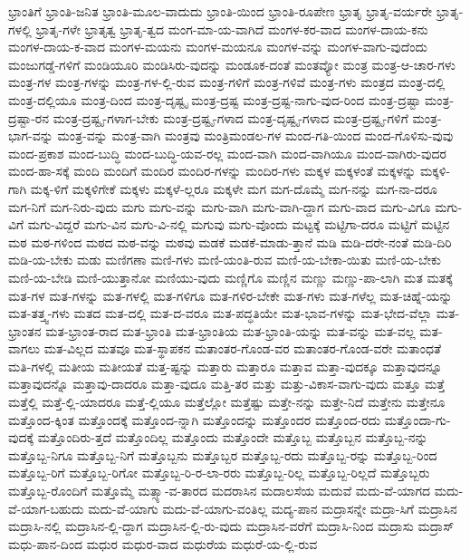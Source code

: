 {ಭ್ರಾಂತಿಗೆ
ಭ್ರಾಂತಿ-ಜನಿತ
ಭ್ರಾಂತಿ-ಮೂಲ-ವಾದುದು
ಭ್ರಾಂತಿ-ಯಿಂದ
ಭ್ರಾಂತಿ-ರೂಪೇಣ
ಭ್ರಾತೃ
ಭ್ರಾತೃ-ವರ್ಯರೇ
ಭ್ರಾತೃ-ಗಳಲ್ಲಿ
ಭ್ರಾತೃ-ಗಳೇ
ಭ್ರಾತೃತ್ವ
ಭ್ರಾತೃ-ತ್ವದ
ಮಂಗ-ಮಾ-ಯ-ವಾಗಿದೆ
ಮಂಗಳ-ಕರ-ವಾದ
ಮಂಗಳ-ದಾಯ-ಕನು
ಮಂಗಳ-ದಾಯ-ಕ-ವಾದ
ಮಂಗಳ-ಮಯನು
ಮಂಗಳ-ಮಯನೂ
ಮಂಗಳ-ವನ್ನು
ಮಂಗಳ-ವಾಗು-ವುದೆಂದು
ಮಂಜುಗಡ್ಡೆ-ಗಳಿಗೆ
ಮಂಡಿಯೂರಿ
ಮಂಡಿಸಿರು-ವುದನ್ನು
ಮಂಡೂಕ-ದಂತೆ
ಮಂತವ್ಯೋ
ಮಂತ್ರ
ಮಂತ್ರ-ಆ-ಚಾರ-ಗಳು
ಮಂತ್ರ-ಗಳ
ಮಂತ್ರ-ಗಳನ್ನು
ಮಂತ್ರ-ಗಳ-ಲ್ಲಿ-ರುವ
ಮಂತ್ರ-ಗಳಿಗೆ
ಮಂತ್ರ-ಗಳಿವೆ
ಮಂತ್ರ-ಗಳು
ಮಂತ್ರದ
ಮಂತ್ರ-ದಲ್ಲಿ
ಮಂತ್ರ-ದಲ್ಲಿಯೂ
ಮಂತ್ರ-ದಿಂದ
ಮಂತ್ರ-ದೃಷ್ಟೃ
ಮಂತ್ರ-ದ್ರಷ್ಟ
ಮಂತ್ರ-ದ್ರಷ್ಟ-ನಾಗು-ವುದ-ರಿಂದ
ಮಂತ್ರ-ದ್ರಷ್ಟಾ
ಮಂತ್ರ-ದ್ರಷ್ಟಾ-ರನ
ಮಂತ್ರ-ದ್ರಷ್ಟೃ-ಗಳಾಗ-ಬೇಕು
ಮಂತ್ರ-ದ್ರಷ್ಟೃ-ಗಳಾದ
ಮಂತ್ರ-ದೃಷ್ಟೃ-ಗಳಾದ
ಮಂತ್ರ-ದ್ರಷ್ಟೃ-ಗಳಿಗೆ
ಮಂತ್ರ-ಭಾಗ-ವನ್ನು
ಮಂತ್ರ-ವನ್ನು
ಮಂತ್ರ-ವಾಗಿ
ಮಂತ್ರವು
ಮಂತ್ರಿಮಂಡಲ-ಗಳ
ಮಂದ-ಗತಿ-ಯಿಂದ
ಮಂದ-ಗೊಳಿಸು-ವುವು
ಮಂದ-ಪ್ರಕಾಶ
ಮಂದ-ಬುದ್ಧಿ
ಮಂದ-ಬುದ್ಧಿ-ಯವ-ರಲ್ಲ
ಮಂದ-ವಾಗಿ
ಮಂದ-ವಾಗಿಯೂ
ಮಂದ-ವಾಗಿರು-ವುದರ
ಮಂದ-ಹಾ-ಸಕ್ಕೆ
ಮಂದಿ
ಮಂದಿಗೆ
ಮಂದಿರ
ಮಂದಿರ-ಗಳನ್ನು
ಮಂದಿರ-ಗಳು
ಮಕ್ಕಳ
ಮಕ್ಕಳಂತೆ
ಮಕ್ಕಳನ್ನು
ಮಕ್ಕಳಿ-ಗಾಗಿ
ಮಕ್ಕ-ಳಿಗೆ
ಮಕ್ಕಳಿಗೇಕೆ
ಮಕ್ಕಳು
ಮಕ್ಕಳೆ-ಲ್ಲರೂ
ಮಕ್ಕಳೇ
ಮಗ
ಮಗ-ದೊಮ್ಮೆ
ಮಗ-ನನ್ನು
ಮಗ-ನಾ-ದರೂ
ಮಗ-ನಿಗೆ
ಮಗ-ನಿರು-ವುದು
ಮಗು
ಮಗು-ವನ್ನು
ಮಗು-ವಾಗಿ
ಮಗು-ವಾಗಿ-ದ್ದಾಗ
ಮಗು-ವಾದ
ಮಗು-ವಿಗೂ
ಮಗು-ವಿಗೆ
ಮಗು-ವಿದ್ದರೆ
ಮಗು-ವಿನ
ಮಗು-ವಿ-ನಲ್ಲಿ
ಮಗುವು
ಮಗು-ವೊಂದು
ಮಟ್ಟಕ್ಕೆ
ಮಟ್ಟಿಗಾ-ದರೂ
ಮಟ್ಟಿಗೆ
ಮಟ್ಟಿನ
ಮಠ
ಮಠ-ಗಳಿಂದ
ಮಠದ
ಮಠ-ವನ್ನು
ಮಠವು
ಮಡಕೆ
ಮಡಕೆ-ಮಾಡು-ತ್ತಾನೆ
ಮಡಿ
ಮಡಿ-ದರೇ-ನಂತೆ
ಮಡಿ-ದಿರಿ
ಮಡಿ-ಯ-ಬೇಕು
ಮಡು
ಮಣಿಗಣಾ
ಮಣಿ-ಗಳು
ಮಣಿ-ಯಂತಿ-ರುವ
ಮಣಿ-ಯ-ಬೇಕಾ-ಯಿತು
ಮಣಿ-ಯ-ಬೇಕು
ಮಣಿ-ಯ-ಬೇಡಿ
ಮಣಿ-ಯುತ್ತಾನೋ
ಮಣಿಯು-ವುದು
ಮಣ್ಣಿಗೊ
ಮಣ್ಣಿನ
ಮಣ್ಣು
ಮಣ್ಣು-ಪಾ-ಲಾಗಿ
ಮತ
ಮತಕ್ಕೆ
ಮತ-ಗಳ
ಮತ-ಗಳನ್ನು
ಮತ-ಗಳಲ್ಲಿ
ಮತ-ಗಳಿಗೂ
ಮತ-ಗಳಿರ-ಬೇಕೇ
ಮತ-ಗಳು
ಮತ-ಗಳೆಲ್ಲ
ಮತ-ಚಿಹ್ನೆ-ಯನ್ನು
ಮತ-ತತ್ತ್ವ-ಗಳು
ಮತದ
ಮತ-ದಲ್ಲಿ
ಮತ-ದ-ವರೂ
ಮತ-ಪದ್ಧತಿಯೇ
ಮತ-ಭಾವ-ಗಳನ್ನು
ಮತ-ಭೇದ-ವೆಲ್ಲಾ
ಮತ-ಭ್ರಾಂತನ
ಮತ-ಭ್ರಾಂತ-ರಾದ
ಮತ-ಭ್ರಾಂತಿ
ಮತ-ಭ್ರಾಂತಿಯ
ಮತ-ಭ್ರಾಂತಿ-ಯನ್ನು
ಮತ-ವನ್ನು
ಮತ-ವಲ್ಲ
ಮತ-ವಾಗಲು
ಮತ-ವಿಲ್ಲದ
ಮತವೂ
ಮತ-ಸ್ಥಾಪಕನ
ಮತಾಂತರ-ಗೊಂಡ-ವರ
ಮತಾಂತರ-ಗೊಂಡ-ವರೇ
ಮತಾಂಧತೆ
ಮತಿ-ಗಳಲ್ಲಿ
ಮತೀಯ
ಮತೀಯತೆ
ಮತ್ತ-ಷ್ಟನ್ನು
ಮತ್ತಾರು
ಮತ್ತಾರೂ
ಮತ್ತಾವ
ಮತ್ತಾ-ವುದಕ್ಕೂ
ಮತ್ತಾವುದನ್ನೂ
ಮತ್ತಾವುದನ್ನೊ
ಮತ್ತಾವು-ದಾದರೂ
ಮತ್ತಾ-ವುದೂ
ಮತ್ತಿ-ತರ
ಮತ್ತು
ಮತ್ತು-ವಿಕಾಸ-ವಾಗು-ವುದು
ಮತ್ತೂ
ಮತ್ತೆ
ಮತ್ತೆಲ್ಲಿ
ಮತ್ತೆ-ಲ್ಲಿ-ಯಾದರೂ
ಮತ್ತೆ-ಲ್ಲಿಯೂ
ಮತ್ತೆಲ್ಲೋ
ಮತ್ತೆಷ್ಟು
ಮತ್ತೇ-ನನ್ನು
ಮತ್ತೇ-ನಿದೆ
ಮತ್ತೇನು
ಮತ್ತೇನೂ
ಮತ್ತೊಂದ-ಕ್ಕಿಂತ
ಮತ್ತೊಂದಕ್ಕೆ
ಮತ್ತೊಂದ-ನ್ನಾಗಿ
ಮತ್ತೊಂದನ್ನು
ಮತ್ತೊಂದರ
ಮತ್ತೊಂದ-ರದು
ಮತ್ತೊಂದಾ-ಗು-ವುದಕ್ಕೆ
ಮತ್ತೊಂದಿರು-ತ್ತದೆ
ಮತ್ತೊಂದಿಲ್ಲ
ಮತ್ತೊಂದು
ಮತ್ತೊಂದೇ
ಮತ್ತೊಬ್ಬ
ಮತ್ತೊಬ್ಬನ
ಮತ್ತೊಬ್ಬ-ನನ್ನು
ಮತ್ತೊಬ್ಬ-ನಿಗೂ
ಮತ್ತೊಬ್ಬ-ನಿಗೆ
ಮತ್ತೊಬ್ಬನು
ಮತ್ತೊಬ್ಬರ
ಮತ್ತೊಬ್ಬ-ರದು
ಮತ್ತೊಬ್ಬ-ರನ್ನು
ಮತ್ತೊಬ್ಬ-ರಿಂದ
ಮತ್ತೊಬ್ಬ-ರಿಗೆ
ಮತ್ತೊಬ್ಬ-ರಿಗೋ
ಮತ್ತೊಬ್ಬ-ರಿ-ರ-ಲಾ-ರರು
ಮತ್ತೊಬ್ಬ-ರಿಲ್ಲ
ಮತ್ತೊಬ್ಬ-ರಿಲ್ಲದೆ
ಮತ್ತೊಬ್ಬರು
ಮತ್ತೊಬ್ಬ-ರೊಂದಿಗೆ
ಮತ್ತೊಮ್ಮೆ
ಮತ್ಸ್ಯಾ-ವ-ತಾರದ
ಮದರಾಸಿನ
ಮದಾಲಸೆಯ
ಮದುವೆ
ಮದು-ವೆ-ಯಾಗದ
ಮದು-ವೆ-ಯಾಗ-ಬಹುದು
ಮದು-ವೆ-ಯಾಗು
ಮದು-ವೆ-ಯಾಗು-ವಂತಿಲ್ಲ
ಮದ್ಯ-ಪಾನ
ಮದ್ರಾಸನ್ನೇ
ಮದ್ರಾ-ಸಿಗೆ
ಮದ್ರಾಸಿನ
ಮದ್ರಾಸಿ-ನಲ್ಲಿ
ಮದ್ರಾಸಿನ-ಲ್ಲಿ-ದ್ದಾಗ
ಮದ್ರಾಸಿನ-ಲ್ಲಿ-ರು-ವುದು
ಮದ್ರಾಸಿನ-ವರೆಗೆ
ಮದ್ರಾಸಿ-ನಿಂದ
ಮದ್ರಾಸು
ಮದ್ರಾಸ್
ಮಧು-ಪಾನ-ದಿಂದ
ಮಧುರ
ಮಧುರ-ವಾದ
ಮಧುರೆಯ
ಮಧುರೆ-ಯ-ಲ್ಲಿ-ರುವ
}
